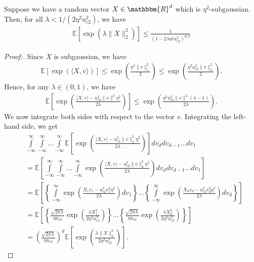 \documentclass[letterpaper, 10 pt]{article}
\newcommand{\E}{\mathbb{E}}
\begin{document}
\begin{lemma}\label{lem:subgaussian}
    Suppose we have a random vector $X\in \mathbbm{R}^d$ which is $\eta^2$-subgaussian. Then, for all $\lambda< 1/(2\eta^2 u_{c2}^2)$, we have
    \begin{align*}
        \E\left[ \exp\left(\lambda\|X\|^2_2 \right)\right] \leq \frac{1}{(1-2\lambda\eta^2 u_{c2}^2)^{d/2}}
    \end{align*}
\end{lemma}
\begin{proof}[Proof:]
Since $X$ is subgaussian, we have
\begin{align*}
    \E[\exp(\langle X,v\rangle)] \leq \exp\left( \frac{\eta^2 \|v\|^2_c}{2}\right) \leq \exp\left(\frac{\eta^2 u_{c2}^2\|v\|^2_2}{2}\right).
\end{align*}
Hence, for any $\lambda\in (0,1)$, we have
\begin{align}\label{eq:initial}
    \E\left[\exp\left( \frac{\langle X,v\rangle-u_{c2}^2\|v\|^2\eta^2}{2\lambda}\right)\right] \leq \exp\left(\frac{\eta^2 u_{c2}^2\|v\|^2(\lambda-1)}{2\lambda}\right).
\end{align}
We now integrate both sides with respect to the vector $v$. Integrating the left-hand side, we get
\begin{align}
    &\int\limits_{-\infty}^\infty \int\limits_{-\infty}^\infty\dots\int\limits_{-\infty}^\infty \E\left[\exp\left( \frac{\langle X,v\rangle-u_{c2}^2\|v\|^2_2\eta^2}{2\lambda}\right)\right] dv_d dv_{d-1}\dots dv_{1} \nonumber \\
    &= \E\left[\int\limits_{-\infty}^\infty \int\limits_{-\infty}^\infty\dots\int\limits_{-\infty}^\infty \exp\left( \frac{\langle X,v\rangle-u_{c2}^2\|v\|^2_2\eta^2}{2\lambda}\right) dv_d dv_{d-1}\dots dv_{1}\right] \tag{Fubini's theorem} \nonumber\\
    &= \E\left[\left\{\int\limits_{-\infty}^\infty \exp\left( \frac{X_1 v_1-u_{c2}^2v_1^2\eta^2}{2\lambda}\right) dv_1\right\} \dots \left\{\int\limits_{-\infty}^\infty \exp\left( \frac{X_d v_d -u_{c2}^2v_d^2\eta^2}{2\lambda}\right) dv_d \right\} \right] \nonumber\\
    &= \E\left[\left\{\frac{\sqrt{2\pi\lambda}}{\eta u_{c2}} \exp\left(\frac{\lambda X_{1}^2}{2\eta^2u_{c2}^2}\right)\right\} \dots \left\{\frac{\sqrt{2\pi\lambda}}{\eta u_{c2}} \exp\left(\frac{\lambda X_{d}^2}{2\eta^2u_{c2}^2}\right)\right\} \right] \nonumber\\
    &= \left(\frac{\sqrt{2\pi\lambda}}{\eta u_{c2}}\right)^d \E\left[ \exp\left( \frac{\lambda\|X\|^2_2}{2\eta^2u_{c2}^2}\right) \right]. \label{eq:left-hand_side}

\end{align}
\end{proof}
\end{document}
